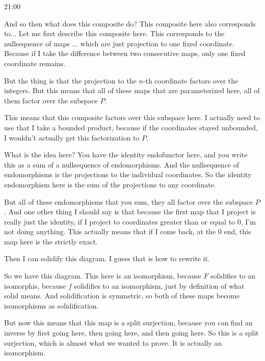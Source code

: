 \begin{unfinished}{21:00}
\begin{sketch}
And so then what does this composite do? This composite here also corresponds to... 
Let me first describe this composite here. This corresponds to the nullsequence of maps ... which are just projection to one fixed coordinate. Because if I take the difference between two consecutive maps, only one fixed coordinate remains. 

But the thing is that the projection to the $n$-th coordinate factors over the integers. 
But this means that all of these maps that are parameterized here, all of them factor over the subspace $P$. 

This means that this composite factors over this subspace here. I actually need to use that I take a bounded product, because if the coordinates stayed unbounded, I wouldn't actually get this factorization to $P$.

What is the idea here? You have the identity endofunctor here, and you write this as a sum of a nullsequence of endomorphisms. 
And the nullsequence of endomorphisms is the projections to the individual coordinates. 
So the identity endomorphism here is the sum of the projections to any coordinate.

But all of these endomorphisms that you sum, they all factor over the subspace $P$. 
And one other thing I should say is that because the first map that I project is really just the identity, if I project to coordinates greater than or equal to 0, I'm not doing anything. 
This actually means that if I come back, at the 0 end, this map here is the strictly exact.

Then I can solidify this diagram. 
I guess that is how to rewrite it.

So we have this diagram. This here is an isomorphism, because $F$ solidifies to an isomorphis, because $f$ solidifies to an isomorphism, just by definition of what solid means. 
And solidification is symmetric, so both of these maps become isomorphisms as solidification. 

But now this means that this map is a split surjection, because you can find an inverse by first going here, then going here, and then going here. So this is a split surjection, which is almost what we wanted to prove. 
It is actually an isomorphism. 


\end{sketch}
\end{unfinished}

